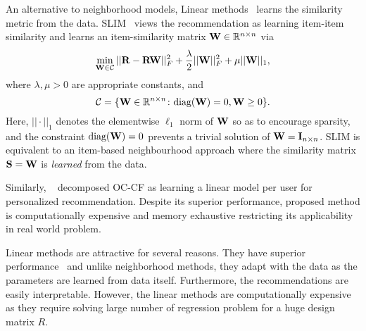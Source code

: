 An alternative to neighborhood models, Linear methods~\cite{Ning:2011, Sedhain:2016} learns the similarity metric from the data. SLIM~\citep{Ning:2011} views the recommendation as learning item-item similarity and learns an item-similarity matrix $\mathbf{W} \in \mathbb{R}^{n \times n}$ via
\begin{equation}
\label{eqn:slim}
\min_{ \mathbf{W} \in \mathcal{C} } || \mathbf{R} - \mathbf{R} \mathbf{W} ||_F^2 + \frac{\lambda}{2} || \mathbf{W} ||_F^2 + \mu || \mathbf{W} ||_1,
\end{equation}
where $\lambda, \mu > 0$ are appropriate constants, and
\begin{equation}
\label{eqn:slim-constraint}
\mathcal{C} = \{ \mathbf{W} \in \mathbb{R}^{n \times n} \colon \text{diag}( \mathbf{W} ) = 0, \mathbf{W} \geq 0 \}.
\end{equation}
Here, $|| \cdot ||_1$ denotes the elementwise $\ell_1$ norm of $\mathbf{W}$ so as to encourage sparsity, and the constraint $\text{diag}( \mathbf{W} ) = 0$ prevents a trivial solution of $\mathbf{W} = \mathbf{I}_{n \times n}$. SLIM is equivalent to an item-based neighbourhood approach where the similarity matrix $\mathbf{S} = \mathbf{W}$ is \emph{learned} from the data.

Similarly, ~\citep{Sedhain:2016} decomposed OC-CF as learning a linear model per user for personalized recommendation. Despite its superior performance, proposed method is computationally expensive and memory exhaustive restricting its applicability in real world problem.

Linear methods are attractive for several reasons. They have superior performance~\cite{Ning:2011, Sedhain:2016} and unlike neighborhood methods, they adapt with the data as the parameters are learned from data itself. Furthermore, the recommendations are easily interpretable. However, the linear methods are computationally expensive as they require solving large number of regression problem for a huge design matrix $R$.


